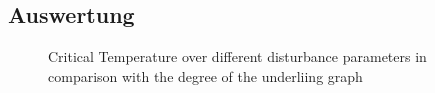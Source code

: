 \subsection{Auswertung}

    \begin{figure}[htbp]
        \centering

        \caption[Critical Temperature over different disturbance parameters]
                {Critical Temperature over different disturbance parameters
                in comparison with the degree of the underliing graph}
        \label{fig:binder_fit_s_0}
    \end{figure}
